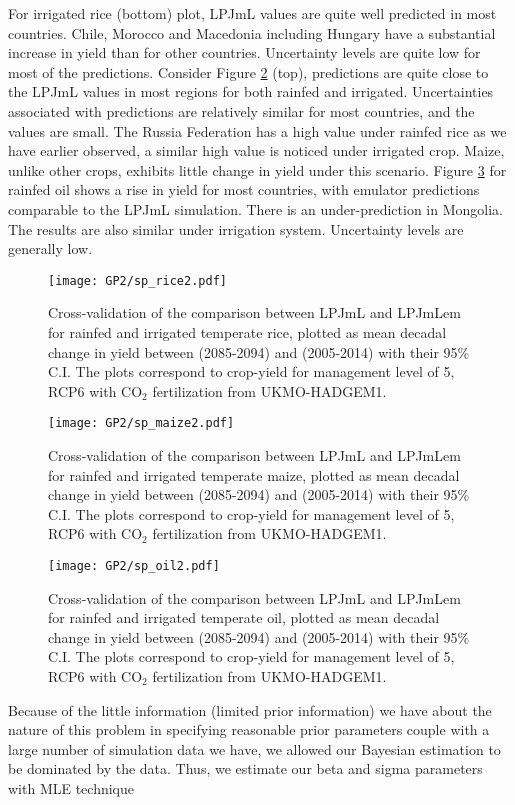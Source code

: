 For irrigated rice (bottom) plot, LPJmL values are quite well predicted in most countries. Chile, Morocco and Macedonia including Hungary have a substantial increase in yield than for other countries. Uncertainty levels are quite low for most of the predictions. Consider Figure \ref{Vc2} (top), predictions are quite close to the LPJmL values in most regions for both rainfed and irrigated. Uncertainties associated with predictions are relatively similar for most countries, and the values are small. The Russia Federation has a high value under rainfed rice as we have earlier observed, a similar high value is noticed under irrigated crop. Maize, unlike other crops, exhibits little change in yield under this scenario. 
Figure \ref{Vd} for rainfed oil shows a rise in yield for most countries, with emulator predictions comparable to the LPJmL simulation. There is an under-prediction in Mongolia. The results are also similar under irrigation system. Uncertainty levels are generally low. 

\begin{figure}[!ht] 
\texttt{[image: GP2/sp\_rice2.pdf]}
\caption[]{Cross-validation of the comparison between LPJmL and LPJmLem for rainfed and irrigated temperate rice, plotted as mean decadal change in yield between (2085-2094) and (2005-2014) with their 95\% C.I. The plots correspond to crop-yield for management level of 5, RCP6 with CO$_2$ fertilization from UKMO-HADGEM1.}\label{Vc1}
\end{figure}

\begin{figure}[!ht] 
\texttt{[image: GP2/sp\_maize2.pdf]}
\caption[]{Cross-validation of the comparison between LPJmL and LPJmLem for rainfed and irrigated temperate maize, plotted as mean decadal change in yield between (2085-2094) and (2005-2014) with their 95\% C.I. The plots correspond to crop-yield for management level of 5, RCP6 with CO$_2$ fertilization from UKMO-HADGEM1.}\label{Vc2}
\end{figure}

\begin{figure}[!ht] 
\texttt{[image: GP2/sp\_oil2.pdf]}
\caption[]{Cross-validation of the comparison between LPJmL and LPJmLem for rainfed and irrigated temperate oil, plotted as mean decadal change in yield between (2085-2094) and (2005-2014) with their 95\% C.I. The plots correspond to crop-yield for management level of 5, RCP6 with CO$_2$ fertilization from UKMO-HADGEM1.}\label{Vd}
\end{figure}

Because of the little information (limited prior information) we have about the nature of this problem in specifying reasonable prior parameters couple with a large number of simulation data we have, we allowed our Bayesian estimation to be dominated by the data. Thus, we estimate our beta and sigma parameters with MLE  technique




